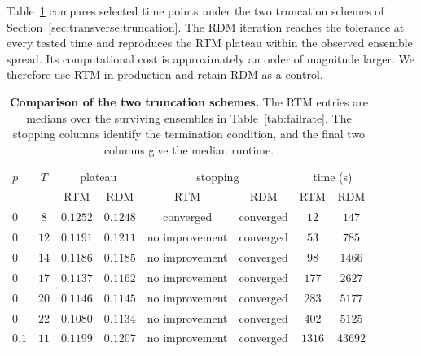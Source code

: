 Table~\ref{tab:rdm} compares selected time points under the two truncation schemes of Section~\ref{sec:transverse:truncation}. The \ac{RDM} iteration reaches the tolerance at every tested time and reproduces the \ac{RTM} plateau within the observed ensemble spread. Its computational cost is approximately an order of magnitude larger. We therefore use \ac{RTM} in production and retain \ac{RDM} as a control.

\begin{table}[!htb]
  \centering
  \begin{tabular}{lccccccc}
    \hline
    $p$   & $T$  & \multicolumn{2}{c}{plateau} & \multicolumn{2}{c}{stopping} & \multicolumn{2}{c}{time (s)}                                   \\
          &      & \ac{RTM}                    & \ac{RDM}                     & \ac{RTM}                     & \ac{RDM}  & \ac{RTM} & \ac{RDM} \\
    \hline
    $0$   & $8$  & $0.1252$                    & $0.1248$                     & converged                    & converged & $12$     & $147$    \\
    $0$   & $12$ & $0.1191$                    & $0.1211$                     & no improvement               & converged & $53$     & $785$    \\
    $0$   & $14$ & $0.1186$                    & $0.1185$                     & no improvement               & converged & $98$     & $1466$   \\
    $0$   & $17$ & $0.1137$                    & $0.1162$                     & no improvement               & converged & $177$    & $2627$   \\
    $0$   & $20$ & $0.1146$                    & $0.1145$                     & no improvement               & converged & $283$    & $5177$   \\
    $0$   & $22$ & $0.1080$                    & $0.1134$                     & no improvement               & converged & $402$    & $5125$   \\
    $0.1$ & $11$ & $0.1199$                    & $0.1207$                     & no improvement               & converged & $1316$   & $43692$  \\
    \hline
  \end{tabular}
  \caption{\textbf{Comparison of the two truncation schemes.} The \ac{RTM} entries are medians over the surviving ensembles in Table~\ref{tab:failrate}. The stopping columns identify the termination condition, and the final two columns give the median runtime.}
  \label{tab:rdm}
\end{table}

